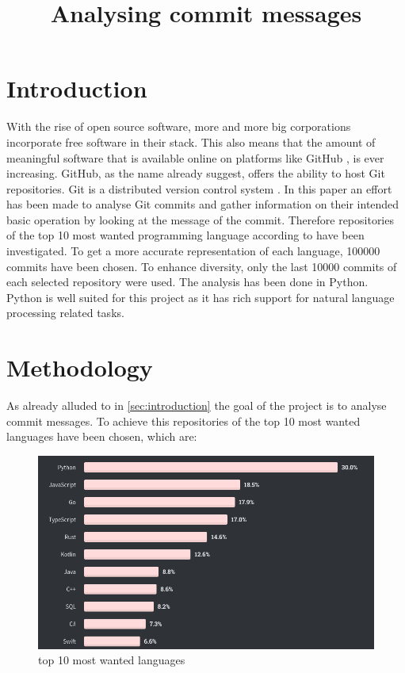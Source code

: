\documentclass{article}
\title{Analysing commit messages}
\begin{document}
  \maketitle

  \section{Introduction}
  \label{sec:introduction}

  With the rise of open source software, more and more big corporations
  incorporate free software in their stack. This also means that the amount of
  meaningful software that is available online on platforms like GitHub
  \cite{github}, is ever increasing. GitHub, as the name already suggest,
  offers the ability to host Git repositories. Git is a distributed version
  control system \cite{git}. In this paper an effort has been made to analyse
  Git commits and gather information on their intended basic operation by
  looking at the message of the commit. Therefore
  repositories of the top 10 most wanted programming language according to
  \cite{so-survey} have been investigated. To get a more accurate
  representation of each language, 100000 commits have been chosen. To enhance
  diversity, only the last 10000 commits of each selected repository were used.
  The analysis has been done in Python. Python is well suited for this project
  as it has rich support for natural language processing related tasks.

  \section{Methodology}
  As already alluded to in \autoref{sec:introduction} the goal of the project is to
  analyse commit messages. To achieve this repositories of the top 10 most
  wanted languages have been chosen, which are:


  \begin{figure}[H]
    \centering
    \includegraphics[width=\textwidth]{wanted_languages.png}
    \caption{top 10 most wanted languages}
    \label{fig:wanted_languages}
  \end{figure}
\end{document}
